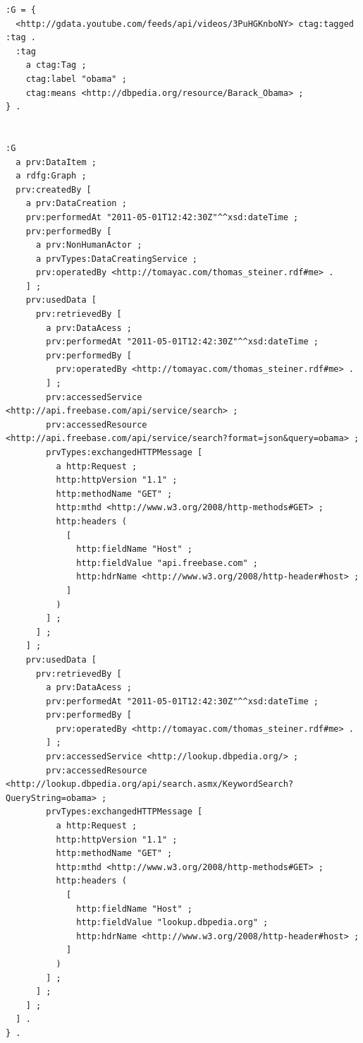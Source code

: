 \documentclass[conference]{IEEEtran}
\begin{document}
\begin{lstlisting}
:G = {
  <http://gdata.youtube.com/feeds/api/videos/3PuHGKnboNY> ctag:tagged :tag .
  :tag
    a ctag:Tag ;
    ctag:label "obama" ;
    ctag:means <http://dbpedia.org/resource/Barack_Obama> ;
} .


:G
  a prv:DataItem ;
  a rdfg:Graph ;
  prv:createdBy [
    a prv:DataCreation ;
    prv:performedAt "2011-05-01T12:42:30Z"^^xsd:dateTime ;
    prv:performedBy [
      a prv:NonHumanActor ;
      a prvTypes:DataCreatingService ;
      prv:operatedBy <http://tomayac.com/thomas_steiner.rdf#me> .
    ] ;
    prv:usedData [
      prv:retrievedBy [
        a prv:DataAcess ;
        prv:performedAt "2011-05-01T12:42:30Z"^^xsd:dateTime ;
        prv:performedBy [
          prv:operatedBy <http://tomayac.com/thomas_steiner.rdf#me> .
        ] ;
        prv:accessedService <http://api.freebase.com/api/service/search> ;
        prv:accessedResource <http://api.freebase.com/api/service/search?format=json&query=obama> ;
        prvTypes:exchangedHTTPMessage [
          a http:Request ;
          http:httpVersion "1.1" ;
          http:methodName "GET" ;
          http:mthd <http://www.w3.org/2008/http-methods#GET> ;
          http:headers (
            [
              http:fieldName "Host" ;
              http:fieldValue "api.freebase.com" ;
              http:hdrName <http://www.w3.org/2008/http-header#host> ;
            ]
          )
        ] ;
      ] ;
    ] ;
    prv:usedData [
      prv:retrievedBy [
        a prv:DataAcess ;
        prv:performedAt "2011-05-01T12:42:30Z"^^xsd:dateTime ;
        prv:performedBy [
          prv:operatedBy <http://tomayac.com/thomas_steiner.rdf#me> .
        ] ;
        prv:accessedService <http://lookup.dbpedia.org/> ;
        prv:accessedResource <http://lookup.dbpedia.org/api/search.asmx/KeywordSearch?QueryString=obama> ;
        prvTypes:exchangedHTTPMessage [
          a http:Request ;
          http:httpVersion "1.1" ;
          http:methodName "GET" ;
          http:mthd <http://www.w3.org/2008/http-methods#GET> ;
          http:headers (
            [
              http:fieldName "Host" ;
              http:fieldValue "lookup.dbpedia.org" ;
              http:hdrName <http://www.w3.org/2008/http-header#host> ;
            ]
          )
        ] ;
      ] ;
    ] ;
  ] .
} .
\end{lstlisting}

\end{document}
